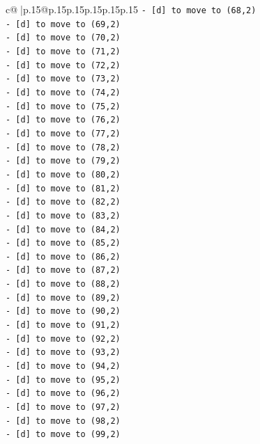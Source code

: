 \documentclass{article}
\begin{document}
{\begin{supertabular}{c@{$\;$}|p{.15\linewidth}@{}p{.15\linewidth}p{.15\linewidth}p{.15\linewidth}p{.15\linewidth}p{.15\linewidth}}
{{{\texttt{{-} {[}d{]} to move to (68,2)} \\
\texttt{{-} {[}d{]} to move to (69,2)} \\
\texttt{{-} {[}d{]} to move to (70,2)} \\
\texttt{{-} {[}d{]} to move to (71,2)} \\
\texttt{{-} {[}d{]} to move to (72,2)} \\
\texttt{{-} {[}d{]} to move to (73,2)} \\
\texttt{{-} {[}d{]} to move to (74,2)} \\
\texttt{{-} {[}d{]} to move to (75,2)} \\
\texttt{{-} {[}d{]} to move to (76,2)} \\
\texttt{{-} {[}d{]} to move to (77,2)} \\
\texttt{{-} {[}d{]} to move to (78,2)} \\
\texttt{{-} {[}d{]} to move to (79,2)} \\
\texttt{{-} {[}d{]} to move to (80,2)} \\
\texttt{{-} {[}d{]} to move to (81,2)} \\
\texttt{{-} {[}d{]} to move to (82,2)} \\
\texttt{{-} {[}d{]} to move to (83,2)} \\
\texttt{{-} {[}d{]} to move to (84,2)} \\
\texttt{{-} {[}d{]} to move to (85,2)} \\
\texttt{{-} {[}d{]} to move to (86,2)} \\
\texttt{{-} {[}d{]} to move to (87,2)} \\
\texttt{{-} {[}d{]} to move to (88,2)} \\
\texttt{{-} {[}d{]} to move to (89,2)} \\
\texttt{{-} {[}d{]} to move to (90,2)} \\
\texttt{{-} {[}d{]} to move to (91,2)} \\
\texttt{{-} {[}d{]} to move to (92,2)} \\
\texttt{{-} {[}d{]} to move to (93,2)} \\
\texttt{{-} {[}d{]} to move to (94,2)} \\
\texttt{{-} {[}d{]} to move to (95,2)} \\
\texttt{{-} {[}d{]} to move to (96,2)} \\
\texttt{{-} {[}d{]} to move to (97,2)} \\
\texttt{{-} {[}d{]} to move to (98,2)} \\
\texttt{{-} {[}d{]} to move to (99,2)} \\
}}}
\end{supertabular}}
\end{document}
